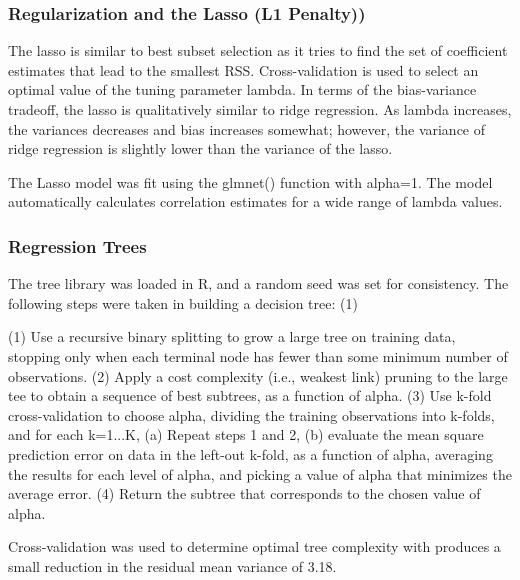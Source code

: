 \documentclass[sigconf]{acmart}
\begin{document}
\subsubsection{Regularization and the Lasso (L1 Penalty))} 
 
The lasso is similar to best subset selection as it tries to find the set of 
coefficient estimates that lead to the smallest RSS. Cross-validation is used to 
select an optimal value of the tuning parameter lambda. In terms of the bias-variance
tradeoff, the lasso is qualitatively similar to ridge regression. As lambda
increases, the variances decreases and bias increases somewhat; however, the
variance of ridge regression is slightly lower than the variance of the lasso.
 
The Lasso model was fit using the glmnet() function with alpha=1. The model
automatically calculates correlation estimates for a wide range of lambda
values.
 

\subsubsection{Regression Trees} 

The tree library was loaded in R, and a random seed was set for consistency. 
The following steps were taken in building a decision tree: (1) 

 (1) Use a recursive binary 
splitting to grow a large tree on training data, stopping only when each 
terminal node has fewer than some minimum number of observations. (2) Apply 
a cost complexity (i.e., weakest link) pruning  to the large tee to obtain 
a sequence of best subtrees, as a function of alpha. (3) Use k-fold 
cross-validation to choose alpha, dividing the training observations into 
k-folds, and for each k=1...K, (a) Repeat steps 1 and 2, (b) evaluate the 
mean square prediction error on data in the left-out k-fold, as a function 
of alpha, averaging the results for each level of alpha, and picking a value 
of alpha that minimizes the average error. (4) Return the subtree that 
corresponds to the chosen value of alpha. 

Cross-validation was used to determine optimal tree complexity with produces 
a small reduction in the residual mean variance of 3.18. 


\end{document}

